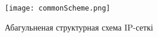 
\vspace{-\baselineskip}
\begin{figure}[h!]
    \renewcommand{\thefigure}{A.1}
    \centering
    \texttt{[image: commonScheme.png]}
    \vspace{-\baselineskip}
    \caption{Абагульненая структурная схема IP-сеткі}
    \label{figure: Common Scheme}
\end{figure}
